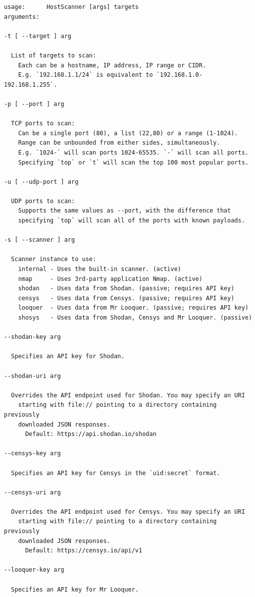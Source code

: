 \documentclass[a4paper,12pt]{article}
\begin{document}
	\begin{verbatim}
usage:		HostScanner [args] targets
arguments:

-t [ --target ] arg

  List of targets to scan:
    Each can be a hostname, IP address, IP range or CIDR.
    E.g. `192.168.1.1/24` is equivalent to `192.168.1.0-192.168.1.255`.

-p [ --port ] arg

  TCP ports to scan:
    Can be a single port (80), a list (22,80) or a range (1-1024).
    Range can be unbounded from either sides, simultaneously.
    E.g. `1024-` will scan ports 1024-65535. `-` will scan all ports.
    Specifying `top` or `t` will scan the top 100 most popular ports.

-u [ --udp-port ] arg

  UDP ports to scan:
    Supports the same values as --port, with the difference that
    specifying `top` will scan all of the ports with known payloads.

-s [ --scanner ] arg

  Scanner instance to use:
    internal - Uses the built-in scanner. (active)
    nmap     - Uses 3rd-party application Nmap. (active)
    shodan   - Uses data from Shodan. (passive; requires API key)
    censys   - Uses data from Censys. (passive; requires API key)
    looquer  - Uses data from Mr Looquer. (passive; requires API key)
    shosys   - Uses data from Shodan, Censys and Mr Looquer. (passive)

--shodan-key arg

  Specifies an API key for Shodan.

--shodan-uri arg

  Overrides the API endpoint used for Shodan. You may specify an URI
    starting with file:// pointing to a directory containing previously
    downloaded JSON responses.
      Default: https://api.shodan.io/shodan

--censys-key arg

  Specifies an API key for Censys in the `uid:secret` format.

--censys-uri arg

  Overrides the API endpoint used for Censys. You may specify an URI
    starting with file:// pointing to a directory containing previously
    downloaded JSON responses.
      Default: https://censys.io/api/v1

--looquer-key arg

  Specifies an API key for Mr Looquer.


\end{verbatim}
\end{document}
